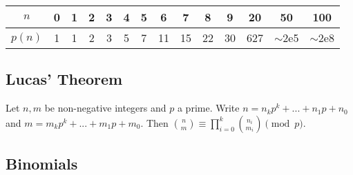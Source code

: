 		\begin{center}
		\begin{tabular}{c|c@{\ }c@{\ }c@{\ }c@{\ }c@{\ }c@{\ }c@{\ }c@{\ }c@{\ }c@{\ }c@{\ }c@{\ }c}
			$n$    & 0 & 1 & 2 & 3 & 4 & 5 & 6  & 7  & 8  & 9  & 20  & 50  & 100 \\ \hline
			$p(n)$ & 1 & 1 & 2 & 3 & 5 & 7 & 11 & 15 & 22 & 30 & 627 & $\mathtt{\sim}$2e5 & $\mathtt{\sim}$2e8 \\
		\end{tabular}
		\end{center}

	\subsection{Lucas' Theorem}
		Let $n,m$ be non-negative integers and $p$ a prime. Write $n=n_kp^k+...+n_1p+n_0$ and $m=m_kp^k+...+m_1p+m_0$. Then $\binom{n}{m} \equiv \prod_{i=0}^k\binom{n_i}{m_i} \pmod{p}$.

	\subsection{Binomials}





